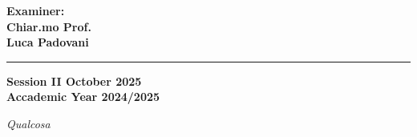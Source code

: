 \documentclass[12pt,a4paper,twoside]{book}
\theoremstyle{definition}
\theoremstyle{definition}
\theoremstyle{definition}
\begin{document}
\begin{titlepage}
\begin{minipage}[t]{0.37\textwidth}
    \vspace{1mm}

    {\large{\bf Examiner: \\ \vspace{-2mm} Chiar.mo Prof. \\ Luca Padovani}}
\end{minipage}

\vspace{20mm}
\rule[0.5cm]{15cm}{0.6mm}

\begin{center}
    {\large{\bf Session II October 2025 \\}}
    {\large{\bf Accademic Year 2024/2025\\}}
\end{center}

\end{titlepage}


\thispagestyle{plain}
\restoregeometry
\topmargin=6.5cm
\begin{flushright}
\emph{
\LARGE{Qualcosa}%
}
\end{flushright}

\newpage~\thispagestyle{plain}~\newpage

{}
\end{document}
